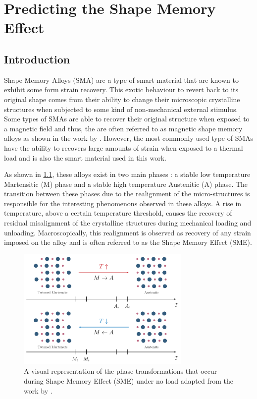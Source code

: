 
\chapter{Predicting the Shape Memory Effect}\label{chap:sma-model}
\section{Introduction}
Shape Memory Alloys (SMA) are a type of smart material that are known to exhibit some form strain recovery. This exotic behaviour to revert back to its original shape comes from their ability to change their microscopic crystalline structures when subjected to some kind of non-mechanical external stimulus. Some types of SMAs are able to recover their original structure when exposed to a magnetic field and thus, the are often referred to as magnetic shape memory alloys as shown in the work by \todocite. However, the most commonly used type of SMAs have the ability to recovers large amounts of strain when exposed to a thermal load and is also the smart material used in this work.

As shown in \cref{fig:sma-phase-transformations}, these alloys exist in two main phases : a stable low temperature Martensitic (M) phase and a stable high temperature Austenitic (A) phase. The transition between these phases due to the realignment of the micro-structures is responsible for the interesting phenomenons observed in these alloys. A rise in temperature, above a certain temperature threshold, causes the recovery of residual misalignment of the crystalline structures during mechanical loading and unloading. Macroscopically, this realignment is observed as recovery of any strain imposed on the alloy and is often referred to as the Shape Memory Effect (SME).

\begin{figure}[hbt]
    \centering
    \includegraphics[width=0.75\textwidth]{images/chap2/sma-phase-transformations.pdf}
    \caption{A visual representation of the phase transformations that occur during Shape Memory Effect (SME) under no load adapted from the work by \cite{raoDesignShapeMemory2015}.}
    \label{fig:sma-phase-transformations}
\end{figure}

